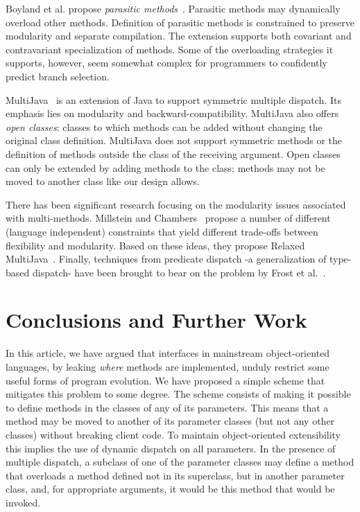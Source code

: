 \documentclass[11pt]{article}
\begin{document}
Boyland et al. propose \emph{parasitic methods}~\cite{parasitic97}. Parasitic methods may dynamically overload other methods. Definition of parasitic methods is constrained to preserve modularity and separate compilation. The extension supports both covariant and contravariant specialization of methods. Some of the overloading strategies it supports, however, seem somewhat complex for programmers to confidently predict branch selection. 

MultiJava~\cite{multijavatoplas06} is an extension of Java to support symmetric multiple dispatch. Its emphasis lies on modularity and backward-compatibility. MultiJava also offers \emph{open classes}: classes to which methods can be added without changing the original class definition. MultiJava does not support symmetric methods or the definition of methods outside the class of the receiving argument. Open classes can only be extended by adding methods to the class; methods may not be moved to another class like our design allows.

There has been significant research focusing on the modularity issues associated with multi-methods. Millstein and Chambers~\cite{dubious} propose a number of different (language independent) constraints that yield different trade-offs between flexibility and modularity. Based on these ideas, they propose Relaxed MultiJava~\cite{relaxedmj03}. Finally, techniques from predicate dispatch -a generalization of type-based dispatch- have been brought to bear on the problem by Frost et al.~\cite{modularjpred}.

\section{Conclusions and Further Work}
\label{sec:conclusions}

In this article, we have argued that interfaces in mainstream object-oriented languages, by leaking \emph{where} methods are implemented, unduly restrict some useful forms of program evolution. We have proposed a simple scheme that mitigates this problem to some degree. The scheme consists of making it possible to define methods in the classes of any of its parameters. This means that a method may be moved to another of its parameter classes (but not any other classes) without breaking client code. To maintain object-oriented extensibility this implies the use of dynamic dispatch on all parameters. In the presence of multiple dispatch, a subclass of one of the parameter classes may define a method that overloads a method defined not in its superclass, but in another parameter class, and, for appropriate arguments, it would be this method that would be invoked.
\end{document}
